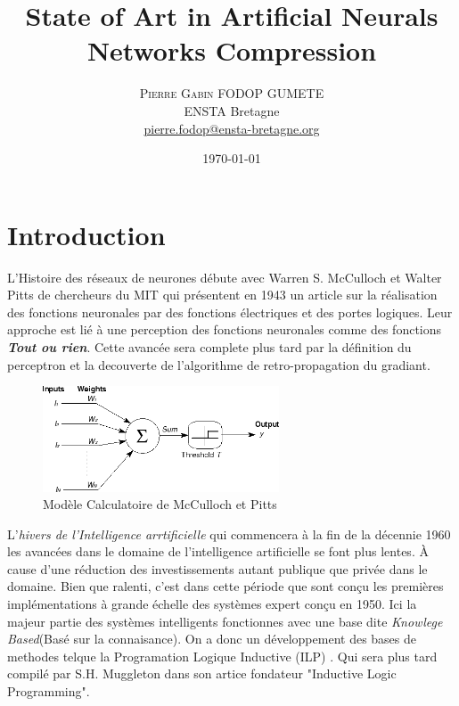 \documentclass[twoside,twocolumn]{article}
\title{State of Art in Artificial Neurals Networks Compression} %
\author{%
\textsc{Pierre Gabin FODOP GUMETE} \\[1ex] %
\normalsize ENSTA Bretagne \\ %
\normalsize \href{mailto:pierre.fodop@ensta-bretagne.org}{pierre.fodop@ensta-bretagne.org} %
}
\date{\today} %
\begin{document}
\maketitle


\section{Introduction}
L'Histoire des réseaux de neurones débute avec Warren S. McCulloch et Walter Pitts de chercheurs du MIT qui présentent 
en 1943 un article sur la réalisation des fonctions neuronales par des fonctions électriques et des portes logiques\cite{warren1}.
Leur approche est lié à une perception des fonctions neuronales comme des fonctions {\bf\textit{Tout ou rien}}. Cette avancée 
sera complete plus tard par la définition du perceptron\cite{RosenBlatt1} et la decouverte de l'algorithme de retro-propagation 
du gradiant\cite{Rumelhart1}.

\begin{figure}[h]
\centering
\includegraphics[width=70mm]{CulochNeurone.png}
\caption{Modèle Calculatoire de McCulloch et Pitts}
\label{SimpleNeuron}
\end{figure}

L'\textit{hivers de l'Intelligence arrtificielle} qui commencera à la fin de la décennie 1960 les avancées dans le domaine de l'intelligence artificielle
se font plus lentes. À cause d'une réduction des investissements autant publique que privée dans le domaine. Bien que ralenti, c'est dans cette période que
sont conçu les premières implémentations à grande échelle des systèmes expert conçu en 1950. Ici la majeur partie des systèmes intelligents fonctionnes avec une 
base dite \textit{Knowlege Based}(Basé sur la connaisance). On a donc un développement des bases de methodes telque la Programation Logique Inductive (ILP)
\cite{Muggleton1}\cite{Ehud1}. Qui sera plus tard compilé par S.H. Muggleton dans son artice fondateur "Inductive Logic Programming"\cite{Muggleton2}.
\end{document}
